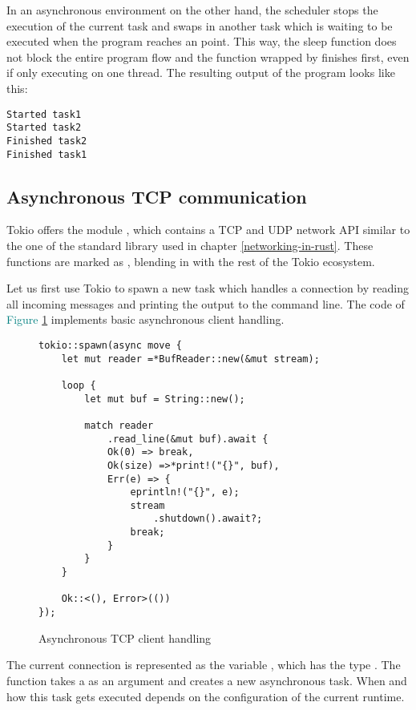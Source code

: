 In an asynchronous environment on the other hand, the scheduler stops the execution of the current task and swaps in
another task which is waiting to be executed when the program reaches an  point. This way, the sleep
function does not block the entire program flow and the function wrapped by  finishes first, even if only
executing on one thread. The resulting output of the program looks like this:

\begin{verbatim}
Started task1
Started task2
Finished task2
Finished task1
\end{verbatim}

\subsection{Asynchronous TCP communication}
Tokio offers the module , which contains a TCP and UDP network API similar to the one of the standard
library used in chapter \ref{networking-in-rust}. These functions are marked as , blending in with
the rest of the Tokio ecosystem.

Let us first use Tokio to spawn a new task which handles a connection by reading all incoming messages and printing the
output to the command line. The code of \textcolor{teal}{Figure \ref{async-tcp-client-handeling}} implements basic
asynchronous client handling.

\begin{figure}[ht]
    \begin{verbatim}
tokio::spawn(async move {
    let mut reader =*BufReader::new(&mut stream);

    loop {
        let mut buf = String::new();

        match reader
            .read_line(&mut buf).await {
            Ok(0) => break,
            Ok(size) =>*print!("{}", buf),
            Err(e) => {
                eprintln!("{}", e);
                stream
                    .shutdown().await?;
                break;
            }
        }
    }

    Ok::<(), Error>(())
});
    \end{verbatim}
    \caption{Asynchronous TCP client handling}
    \label{async-tcp-client-handeling}
\end{figure}

The current connection is represented as the variable , which has the type .
The function  takes a  as an argument and creates a new asynchronous task. When and how
this task gets executed depends on the configuration of the current runtime.

